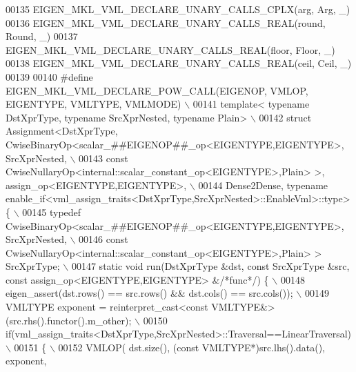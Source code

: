 \begin{DoxyCode}
00135 EIGEN\_MKL\_VML\_DECLARE\_UNARY\_CALLS\_CPLX(arg, Arg,      \_)
00136 EIGEN\_MKL\_VML\_DECLARE\_UNARY\_CALLS\_REAL(round, Round,  \_)
00137 EIGEN\_MKL\_VML\_DECLARE\_UNARY\_CALLS\_REAL(floor, Floor,  \_)
00138 EIGEN\_MKL\_VML\_DECLARE\_UNARY\_CALLS\_REAL(ceil,  Ceil,   \_)
00139 
00140 \textcolor{preprocessor}{#define EIGEN\_MKL\_VML\_DECLARE\_POW\_CALL(EIGENOP, VMLOP, EIGENTYPE, VMLTYPE, VMLMODE)                        
                         \(\backslash\)}
00141 \textcolor{preprocessor}{  template< typename DstXprType, typename SrcXprNested, typename Plain>                                    
                         \(\backslash\)}
00142 \textcolor{preprocessor}{  struct Assignment<DstXprType, CwiseBinaryOp<scalar\_##EIGENOP##\_op<EIGENTYPE,EIGENTYPE>, SrcXprNested,    
                         \(\backslash\)}
00143 \textcolor{preprocessor}{                    const CwiseNullaryOp<internal::scalar\_constant\_op<EIGENTYPE>,Plain> >,
       assign\_op<EIGENTYPE,EIGENTYPE>,    \(\backslash\)}
00144 \textcolor{preprocessor}{                   Dense2Dense, typename
       enable\_if<vml\_assign\_traits<DstXprType,SrcXprNested>::EnableVml>::type> \{            \(\backslash\)}
00145 \textcolor{preprocessor}{    typedef CwiseBinaryOp<scalar\_##EIGENOP##\_op<EIGENTYPE,EIGENTYPE>, SrcXprNested,                        
                         \(\backslash\)}
00146 \textcolor{preprocessor}{                    const CwiseNullaryOp<internal::scalar\_constant\_op<EIGENTYPE>,Plain> > SrcXprType;      
                         \(\backslash\)}
00147 \textcolor{preprocessor}{    static void run(DstXprType &dst, const SrcXprType &src, const assign\_op<EIGENTYPE,EIGENTYPE> &}\textcolor{comment}{/*func*/}\textcolor{preprocessor}{)
       \{                 \(\backslash\)}
00148 \textcolor{preprocessor}{      eigen\_assert(dst.rows() == src.rows() && dst.cols() == src.cols());                                  
                         \(\backslash\)}
00149 \textcolor{preprocessor}{      VMLTYPE exponent = reinterpret\_cast<const VMLTYPE&>(src.rhs().functor().m\_other);                    
                         \(\backslash\)}
00150 \textcolor{preprocessor}{      if(vml\_assign\_traits<DstXprType,SrcXprNested>::Traversal==LinearTraversal)                           
                         \(\backslash\)}
00151 \textcolor{preprocessor}{      \{                                                                                                    
                         \(\backslash\)}
00152 \textcolor{preprocessor}{        VMLOP( dst.size(), (const VMLTYPE*)src.lhs().data(), exponent,                                     
}
\end{DoxyCode}
